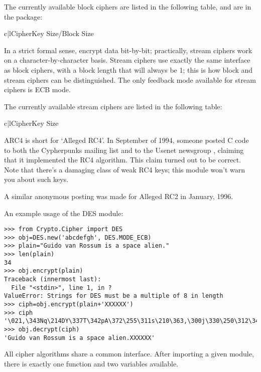 \documentclass{howto}
\begin{document}
The currently available block ciphers are listed in the following table,
and are in the  package:

\begin{tableii}{c|l}{}{Cipher}{Key Size/Block Size}
\end{tableii}

In a strict formal sense,  encrypt data bit-by-bit;
practically, stream ciphers work on a character-by-character basis.
Stream ciphers use exactly the
same interface as block ciphers, with a block length that will always
be 1; this is how block and stream ciphers can be distinguished. 
The only feedback mode available for stream ciphers is ECB mode. 

The currently available stream ciphers are listed in the following table:

\begin{tableii}{c|l}{}{Cipher}{Key Size}
\end{tableii}

ARC4 is short for `Alleged RC4'.  In September of 1994, someone posted
C code to both the Cypherpunks mailing list and to the Usenet
newsgroup , claiming that it implemented the RC4
algorithm.  This claim turned out to be correct.  Note that there's a
damaging class of weak RC4 keys; this module won't warn you about such keys.

A similar anonymous posting was made for Alleged RC2 in January, 1996.

An example usage of the DES module:
\begin{verbatim}
>>> from Crypto.Cipher import DES
>>> obj=DES.new('abcdefgh', DES.MODE_ECB)
>>> plain="Guido van Rossum is a space alien."
>>> len(plain)
34
>>> obj.encrypt(plain)
Traceback (innermost last):
  File "<stdin>", line 1, in ?
ValueError: Strings for DES must be a multiple of 8 in length
>>> ciph=obj.encrypt(plain+'XXXXXX')
>>> ciph
'\021,\343Nq\214DY\337T\342pA\372\255\311s\210\363,\300j\330\250\312\347\342I\3215w\03561\303dgb/\006'
>>> obj.decrypt(ciph)
'Guido van Rossum is a space alien.XXXXXX'
\end{verbatim}

All cipher algorithms share a common interface.  After importing a
given module, there is exactly one function and two variables
available.
\end{document}
